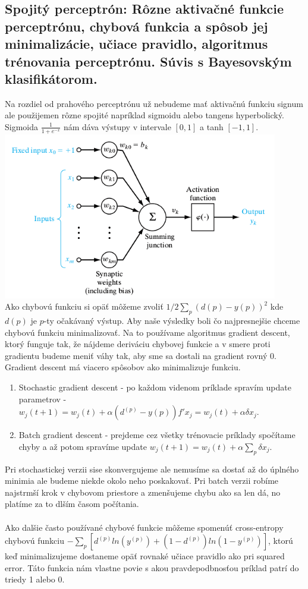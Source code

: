 \documentclass{article}
\numberwithin{equation}{section} %
\begin{document}
\subsection{Spojitý perceptrón: Rôzne aktivačné funkcie perceptrónu, chybová funkcia a spôsob jej minimalizácie, učiace pravidlo, algoritmus trénovania perceptrónu. Súvis s Bayesovským klasifikátorom.}
Na rozdiel od prahového perceptrónu už nebudeme mať aktivačnú funkciu signum ale použijemen rôzne spojité napríklad sigmoidu alebo tangens hyperbolický. Sigmoida $\frac{1}{1 + e^{-x}}$ nám dáva výstupy v intervale $[0, 1]$ a tanh $[-1, 1]$.\\
\includegraphics[width=12cm]{imgs/cont_neuron}\\
Ako chybovú funkciu si opäť môžeme zvoliť $1/2 \sum_p (d{(p)}- y{(p)})^2$ kde $d{(p)}$ je $p$-ty očakávaný výstup. Aby naše výsledky boli čo najpresnejšie chceme chybovú funkciu minimalizovať. Na to používame algoritmus gradient descent, ktorý funguje tak, že nájdeme deriváciu chybovej funkcie a v smere proti gradientu budeme meniť váhy tak, aby sme sa dostali na gradient rovný 0. Gradient descent má viacero spôsobov ako minimalizuje funkciu.
\begin{enumerate}
\item Stochastic gradient descent - po každom videnom príklade spravím update parametrov - $w_j(t+1) = w_j(t) + \alpha(d^{(p)} - y{(p)})f'x_j = w_j(t) + \alpha\delta x_j$. 
\item Batch gradient descent - prejdeme cez všetky trénovacie príklady spočítame chyby a až potom spravíme update $w_j(t+1) = w_j(t) + \alpha \sum_p \delta x_j$.
\end{enumerate}
Pri stochastickej verzii sise skonvergujeme ale nemusíme sa dostať až do úplného minimia ale budeme niekde okolo neho poskakovať. Pri batch verzii robíme najstrmší krok v chybovom priestore a zmenšujeme chybu ako sa len dá, no platíme za to dlším časom počítania. \\\\
Ako dalšie často používané chybové funkcie môžeme spomenúť cross-entropy chybovú funkciu $-\sum_p [d^{(p)} ln (y^{(p)}) + (1 - d^{(p)})ln(1-y^{(p)})]$, ktorú keď minimalizujeme dostaneme opäť rovnaké učiace pravidlo ako pri squared error. Táto funkcia nám vlastne povie s akou pravdepodbnosťou príklad patrí do triedy 1 alebo 0.
\end{document}
